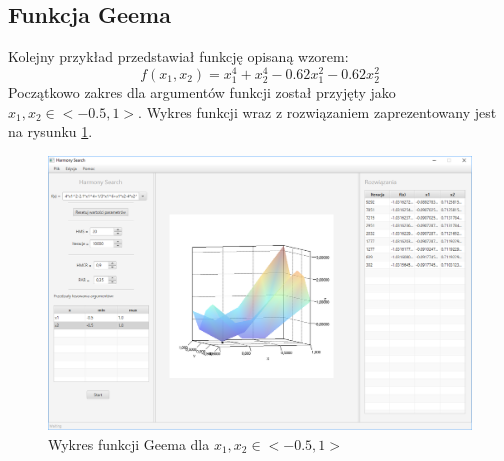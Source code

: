\documentclass[10pt, a4paper]{article}
\begin{document}
\subsection{Funkcja Geema}
\label{subsec:gemm}
Kolejny przykład przedstawiał funkcję opisaną wzorem: $$f(x_{1},x_{2}) = x_{1}^{4}+x_{2}^{4}-0.62x_{1}^{2}-0.62x_{2}^{2}$$ Początkowo zakres dla argumentów funkcji został przyjęty jako $x_{1},x_{2} \in <-0.5,1>$. Wykres funkcji wraz z rozwiązaniem zaprezentowany jest na rysunku \ref{fig:21}. 
\begin{figure}[htbp]
	\centering
	\includegraphics[width=.9\textwidth]{images/21.PNG}
	\caption{Wykres funkcji Geema dla $x_{1}, x_{2} \in <-0.5,1>$}
	\label{fig:21}
\end{figure}
\end{document}
